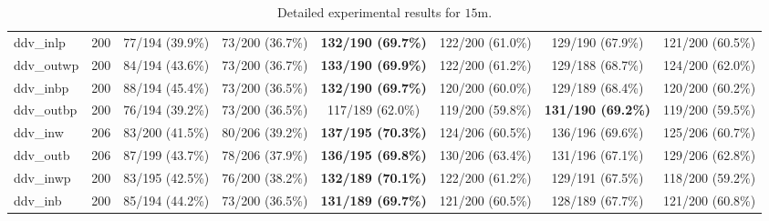 \begin{landscape}
\begin{table}[h]
{\begin{tabular}[a]{|lc||c|c||c|c||c|c|}
ddv\_inlp      &  200 &   77/194  (39.9\%) &   73/200  (36.7\%) & \textbf{ 132/190  (69.7\%)} &  122/200  (61.0\%) &    129/190  (67.9\%) &  121/200  (60.5\%)  \\
ddv\_outwp     &  200 &   84/194  (43.6\%) &   73/200  (36.7\%) & \textbf{ 133/190  (69.9\%)} &  122/200  (61.2\%) &    129/188  (68.7\%) &  124/200  (62.0\%)  \\
ddv\_inbp      &  200 &   88/194  (45.4\%) &   73/200  (36.5\%) & \textbf{ 132/190  (69.7\%)} &  120/200  (60.0\%) &    129/189  (68.4\%) &  120/200  (60.2\%)  \\
ddv\_outbp     &  200 &   76/194  (39.2\%) &   73/200  (36.5\%) &  117/189  (62.0\%) &  119/200  (59.8\%) &   \textbf{ 131/190  (69.2\%)} &  119/200  (59.5\%)  \\
ddv\_inw       &  206 &   83/200  (41.5\%) &   80/206  (39.2\%) & \textbf{ 137/195  (70.3\%)} &  124/206  (60.5\%) &     136/196  (69.6\%) &  125/206  (60.7\%)  \\
ddv\_outb      &  206 &   87/199  (43.7\%) &   78/206  (37.9\%) & \textbf{ 136/195  (69.8\%)} &  130/206  (63.4\%) &    131/196  (67.1\%) &  129/206  (62.8\%)  \\
ddv\_inwp      &  200 &   83/195  (42.5\%) &   76/200  (38.2\%) & \textbf{ 132/189  (70.1\%)} &  122/200  (61.2\%) &    129/191  (67.5\%) &  118/200  (59.2\%)  \\
ddv\_inb       &  200 &   85/194  (44.2\%) &   73/200  (36.5\%) & \textbf{ 131/189  (69.7\%)} &  121/200  (60.5\%) &    128/189  (67.7\%) &  121/200  (60.8\%)  \\
\hline
      \end{tabular}}
    \caption{Detailed experimental results for $15$m.}
    \label{tab:exp_d}
\end{table}
\end{landscape}
